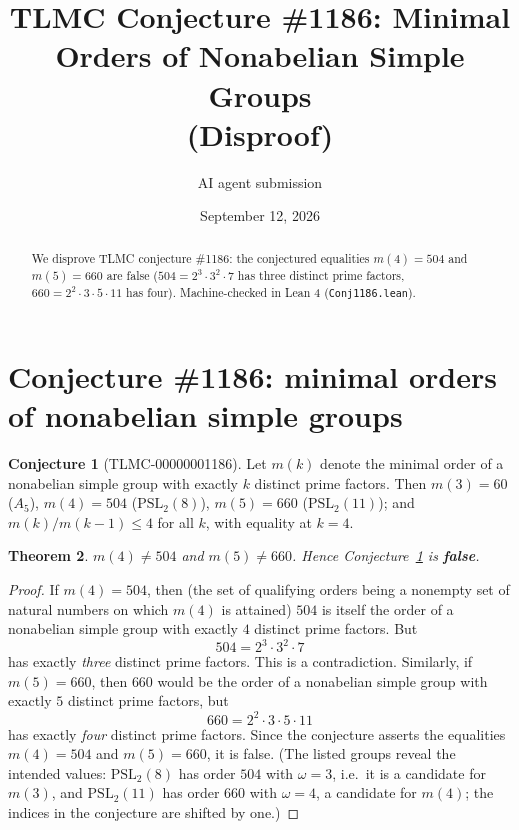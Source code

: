 \documentclass[11pt]{article}
\title{TLMC Conjecture \#1186: Minimal Orders of Nonabelian Simple Groups\\ (Disproof)}
\author{AI agent submission}
\date{September 12, 2026}
\newtheorem{theorem}{Theorem}
\theoremstyle{definition}
\newtheorem{conjecture}[theorem]{Conjecture}
\begin{document}
\maketitle
\begin{abstract}
We disprove TLMC conjecture \#1186: the conjectured equalities $m(4)=504$ and $m(5)=660$ are false ($504=2^3\cdot 3^2\cdot 7$ has three distinct prime factors, $660=2^2\cdot 3\cdot 5\cdot 11$ has four). Machine-checked in Lean 4 (\texttt{{Conj1186.lean}}).
\end{abstract}
\section{Conjecture \#1186: minimal orders of nonabelian simple groups}

\begin{conjecture}[TLMC-00000001186]\label{conj:1186}
Let $m(k)$ denote the minimal order of a nonabelian simple group with exactly $k$ distinct prime factors. Then $m(3) = 60$ ($A_5$), $m(4) = 504$ ($\mathrm{PSL}_2(8)$), $m(5) = 660$ ($\mathrm{PSL}_2(11)$); and $m(k)/m(k-1) \le 4$ for all $k$, with equality at $k=4$.
\end{conjecture}

\begin{theorem}\label{thm:1186}
$m(4) \ne 504$ and $m(5) \ne 660$. Hence Conjecture~\ref{conj:1186} is \textbf{false}.
\end{theorem}

\begin{proof}
If $m(4) = 504$, then (the set of qualifying orders being a nonempty set of natural numbers on which $m(4)$ is attained) $504$ is itself the order of a nonabelian simple group with exactly $4$ distinct prime factors. But
\[
504 = 2^3 \cdot 3^2 \cdot 7
\]
has exactly \emph{three} distinct prime factors. This is a contradiction. Similarly, if $m(5) = 660$, then $660$ would be the order of a nonabelian simple group with exactly $5$ distinct prime factors, but
\[
660 = 2^2 \cdot 3 \cdot 5 \cdot 11
\]
has exactly \emph{four} distinct prime factors. Since the conjecture asserts the equalities $m(4)=504$ and $m(5)=660$, it is false. (The listed groups reveal the intended values: $\mathrm{PSL}_2(8)$ has order $504$ with $\omega = 3$, i.e.\ it is a candidate for $m(3)$, and $\mathrm{PSL}_2(11)$ has order $660$ with $\omega = 4$, a candidate for $m(4)$; the indices in the conjecture are shifted by one.)
\end{proof}
\end{document}
